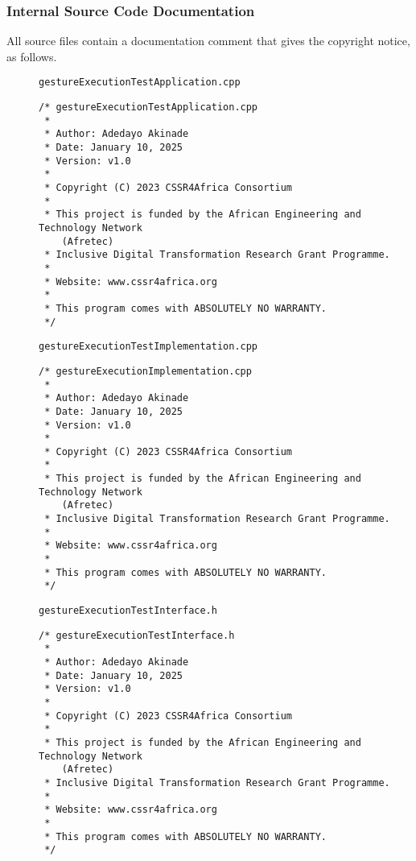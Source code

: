 \documentclass{CSSRforAfrica}
\newcommand{\checkboxChecked}{\fbox{\ding{51}}} %
\begin{document}
 
 
\subsubsection{Internal Source Code Documentation}
\label{subsubsection:gesture_execution_test_documentation_standards}  

\noindent All source files contain a documentation comment that gives the copyright notice, as follows.
 
\begin{description}

\item[\checkboxChecked] {\small \verb+gestureExecutionTestApplication.cpp+}  
{\small \begin{verbatim}
/* gestureExecutionTestApplication.cpp
 *
 * Author: Adedayo Akinade
 * Date: January 10, 2025
 * Version: v1.0
 * 
 * Copyright (C) 2023 CSSR4Africa Consortium
 * 
 * This project is funded by the African Engineering and Technology Network 
    (Afretec) 
 * Inclusive Digital Transformation Research Grant Programme. 
 *
 * Website: www.cssr4africa.org
 *
 * This program comes with ABSOLUTELY NO WARRANTY.
 */
\end{verbatim} }

\newpage
\item[\checkboxChecked]  {\small \verb+gestureExecutionTestImplementation.cpp+}  
{\small \begin{verbatim}
/* gestureExecutionImplementation.cpp
 *
 * Author: Adedayo Akinade
 * Date: January 10, 2025
 * Version: v1.0
 * 
 * Copyright (C) 2023 CSSR4Africa Consortium
 * 
 * This project is funded by the African Engineering and Technology Network
    (Afretec) 
 * Inclusive Digital Transformation Research Grant Programme. 
 *
 * Website: www.cssr4africa.org
 *
 * This program comes with ABSOLUTELY NO WARRANTY.
 */
\end{verbatim} }

\item[\checkboxChecked] {\small \verb+gestureExecutionTestInterface.h+}   
{\small \begin{verbatim}
/* gestureExecutionTestInterface.h
 *
 * Author: Adedayo Akinade
 * Date: January 10, 2025
 * Version: v1.0
 * 
 * Copyright (C) 2023 CSSR4Africa Consortium
 * 
 * This project is funded by the African Engineering and Technology Network
    (Afretec) 
 * Inclusive Digital Transformation Research Grant Programme. 
 *
 * Website: www.cssr4africa.org
 *
 * This program comes with ABSOLUTELY NO WARRANTY.
 */
\end{verbatim} }


\end{description}
\end{document}
